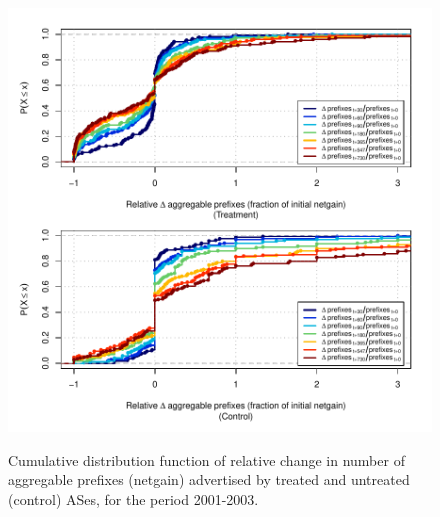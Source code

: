 \clearpage
\vspace*{16pt}
\begin{figure}[H]
\begin{centering}
\begin{singlespace}
\captionsetup{list=no}
    \includegraphics[width=6in]{figures/behavior-rel_netgain-2001_2003-corr.pdf}
    \vspace{-2em}\\
    \caption{Cumulative distribution function of relative change in number of
    aggregable prefixes (netgain) advertised by treated and untreated (control)
    ASes, for the period 2001-2003.}
\end{singlespace}
\end{centering}
\end{figure}

